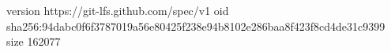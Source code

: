 version https://git-lfs.github.com/spec/v1
oid sha256:94dabc0f6f3787019a56e80425f238e94b8102e286baa8f423f8cd4de31c9399
size 162077
